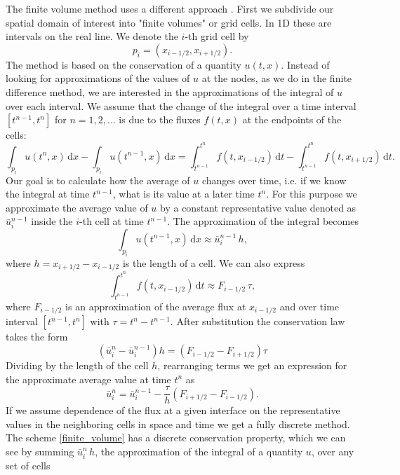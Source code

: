 \documentclass[../include.tex]{subfiles}
\begin{document}
The finite volume method uses a different approach \cite{lev, patankar}. First we subdivide our spatial domain of interest into "finite volumes" or grid cells. In 1D these are intervals on the real line. We denote the $ i $-th grid cell by
\[
p_i = (x_{i-1/2}, x_{i+1/2}).
\]
The method is based on the conservation of a quantity $ u(t, x) $. Instead of looking for approximations of the values of $ u $ at the nodes, as we do in the finite difference method, we are interested in the approximations of the integral of $ u $ over each interval. We assume that the change of the integral over a time interval $ [t^{n-1}, t^{n}] $ for $ n=1,2,... $ is due to the fluxes $ f(t, x) $ at the endpoints of the cells:
\begin{equation}
	\label{conservation_integral}
	\int_{p_i} u(t^{n}, x) \,\mathrm{d}x - \int_{p_i} u(t^{n-1}, x) \,\mathrm{d}x = 
\int_{t^{n-1}}^{t^{n}} f(t, x_{i-1/2}) \,\mathrm{d}t - \int_{t^{n-1}}^{t^{n}} f(t, x_{i+1/2}) \,\mathrm{d}t.
\end{equation}
Our goal is to calculate how the average of $ u $ changes over time, i.e. if we know the integral at time $ t^{n-1} $, what is its value at a later time $ t^{n} $.
For this purpose we approximate the average value of $ u $ by a constant representative value denoted as $ \bar{u}_i^{n-1} $ inside the $ i $-th cell at time $ t^{n-1} $. The approximation of the integral becomes
\[
\int_{p_i} u(t^{n-1}, x) \,\mathrm{d}x \approx \bar{u}_i^{n-1}\, h,
\]
where  $ h = x_{i+1/2} - x_{i-1/2} $ is the length of a cell.
We can also express
\[
\int_{t^{n-1}}^{t^{n}} f(t, x_{i-1/2}) \,\mathrm{d}t \approx F_{i-1/2}\, \tau,
\]
where $ F_{i-1/2} $ is an approximation of the average flux at $ x_{i-1/2} $ and over time interval $ [t^{n-1}, t^{n}] $ with $ \tau = t^{n} - t^{n-1} $.
After substitution the conservation law takes the form
\[
(\bar{u}_i^{n} - \bar{u}_i^{n-1}) h = (F_{i-1/2} -  F_{i+1/2}) \tau
\]
Dividing by the length of the cell $ h $, rearranging terms we get an expression for the approximate average value at time $ t^{n} $ as
\begin{equation}
	\label{finite_volume}
	\bar{u}_i^{n} = \bar{u}_i^{n-1} - \frac{\tau}{h}(F_{i+1/2} - F_{i-1/2}).
\end{equation}
If we assume dependence of the flux at a given interface on the representative values in the neighboring cells in space and time we get a fully discrete method. The scheme \eqref{finite_volume} has a discrete conservation property, which we can see by summing $ \bar{u}_i^{n}\, h $, the approximation of the integral of a quantity $ u $, over any set of cells
\end{document}
